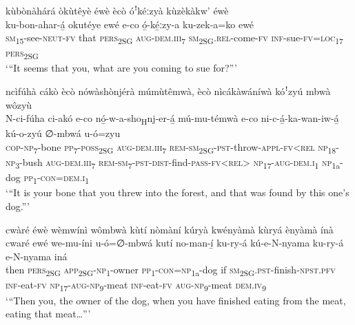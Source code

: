 kùbònàhárá òkùtêyè éwè ècò óꜝkéːzyà kùzèkàkw’ éwè\\
\gll ku-bon-ahar-á̲  okutéye  ewé e-co    ó̲-ké̲ːzy-a    ku-zek-a=ko    ewé \\
\textsc{sm}\textsubscript{15}{}-see-\textsc{neut}{}-\textsc{fv}  that    \textsc{pers}\textsubscript{2SG}
\textsc{aug}{}-\textsc{dem}.\textsc{iii}\textsubscript{7}  \textsc{sm}\textsubscript{2SG}.\textsc{rel}{}-come-\textsc{fv}  \textsc{inf}{}-sue-\textsc{fv}=\textsc{loc}\textsubscript{17}  \textsc{pers}\textsubscript{2SG}\\
\glt ‘“It seems that you, what are you coming to sue for?”’\bigskip

ncìfúhà cákò ècò nówàshònjérà múmùtêmwà, ècò nìcákàwáníwà kóꜝzyú mbwà wôzyù\\
\gll N-ci-fúha    ci-akó    e-co    nó̲-w-a-sho\textsubscript{H}nj-er-á̲ mú-mu-témwà  e-co    ni-c-á̲-ka-wan-iw-á̲  kú-o-zyú    ∅-mbwá  u-ó=zyu\\
\textsc{cop}{}-\textsc{np}\textsubscript{7}{}-bone  \textsc{pp}\textsubscript{7}{}-\textsc{poss}\textsubscript{2SG} \textsc{aug}{}-\textsc{dem}.\textsc{iii}\textsubscript{7}  \textsc{rem}{}-\textsc{sm}\textsubscript{2SG}{}-\textsc{pst}{}-throw-\textsc{appl}{}-\textsc{fv}<\textsc{rel}
\textsc{np}\textsubscript{18}{}-\textsc{np}\textsubscript{3}{}-bush  \textsc{aug}{}-\textsc{dem}.\textsc{iii}\textsubscript{7}  \textsc{rem}{}-\textsc{sm}\textsubscript{7}{}-\textsc{pst}{}-\textsc{dist}{}-find-\textsc{pass}{}-\textsc{fv}<\textsc{rel}>
\textsc{np}\textsubscript{17}{}-\textsc{aug}{}-\textsc{dem}.\textsc{i}\textsubscript{1}  \textsc{np}\textsubscript{1a}{}-dog  \textsc{pp}\textsubscript{1}{}-\textsc{con}=\textsc{dem}.\textsc{i}\textsubscript{1}\\
\glt ‘“It is your bone that you threw into the forest, and that was found by this one’s dog.”’\bigskip

cwàré éwè wèmwínì wômbwà kùtí nòmàní kúryà kwényàmà kùryá ènyàmà ínà\\
\gll cwaré  ewé    we-mu-íni    u-ó=∅-mbwá   kutí  no-man-í̲       ku-ry-á  kú-e-N-nyama ku-ry-á  e-N-nyama    iná \\
then  \textsc{pers}\textsubscript{2SG}  \textsc{app}\textsubscript{2SG}{}-\textsc{np}\textsubscript{1}{}-owner  \textsc{pp}\textsubscript{1}{}-\textsc{con}=\textsc{np}\textsubscript{1a}{}-dog
if  \textsc{sm}\textsubscript{2SG}.\textsc{pst}{}-finish-\textsc{npst}.\textsc{pfv}  \textsc{inf}{}-eat-\textsc{fv}  \textsc{np}\textsubscript{17}{}-\textsc{aug}{}-\textsc{np}\textsubscript{9}{}-meat
\textsc{inf}{}-eat-\textsc{fv}  \textsc{aug}{}-\textsc{np}\textsubscript{9}{}-meat  \textsc{dem}.\textsc{iv}\textsubscript{9}\\
\glt ‘“Then you, the owner of the dog, when you have finished eating from the meat, eating that meat…”’\bigskip

